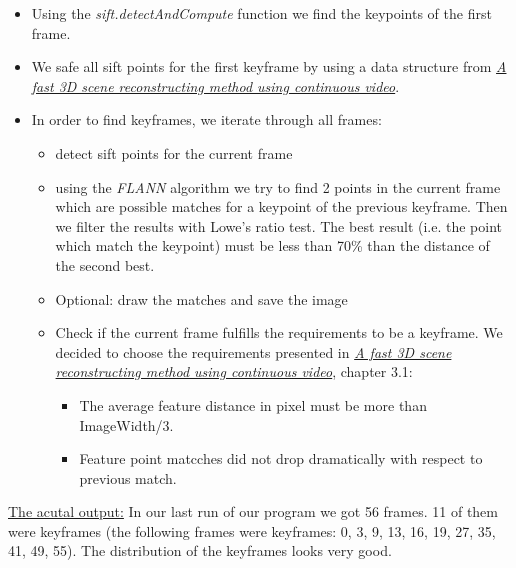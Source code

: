 \documentclass[paper=a4, fontsize=11pt]{scrartcl}
\numberwithin{equation}{section}		%
\numberwithin{figure}{section}			%
\numberwithin{table}{section}				%
\begin{document}
\begin{itemize}
\item Using the \emph{sift.detectAndCompute} function we find the keypoints of the first frame.
\item We safe all sift points for the first keyframe by using a data structure from \emph{\href{https://jivp-eurasipjournals.springeropen.com/track/pdf/10.1186/s13640-017-0168-3}{A fast 3D scene reconstructing method using continuous video}}.
\item  In order to find keyframes, we iterate through all frames:
\begin{itemize}
\item detect sift points for the current frame
\item using the \emph{FLANN} algorithm we try to find 2 points in the current frame which are possible matches for a keypoint of the previous keyframe. Then we filter the results with Lowe's ratio test. The best result (i.e. the point which match the keypoint) must be less than 70\% than the distance of the second best.
\item Optional: draw the matches and save the image
\item Check if the current frame fulfills the requirements to be a keyframe. We decided to choose the requirements presented in \emph{\href{https://jivp-eurasipjournals.springeropen.com/track/pdf/10.1186/s13640-017-0168-3}{A fast 3D scene reconstructing method using continuous video}}, chapter 3.1:
\begin{itemize}
\item The average feature distance in pixel must be more than ImageWidth/3.
\item Feature point matcches did not drop dramatically with respect to previous match.
\end{itemize}
\end{itemize}
\end{itemize}
\underline{The acutal output:} In our last run of our program we got 56 frames. 11 of them were keyframes (the following frames were keyframes: 0, 3, 9, 13, 16, 19, 27, 35, 41, 49, 55). The distribution of the keyframes looks very good.
\end{document}
